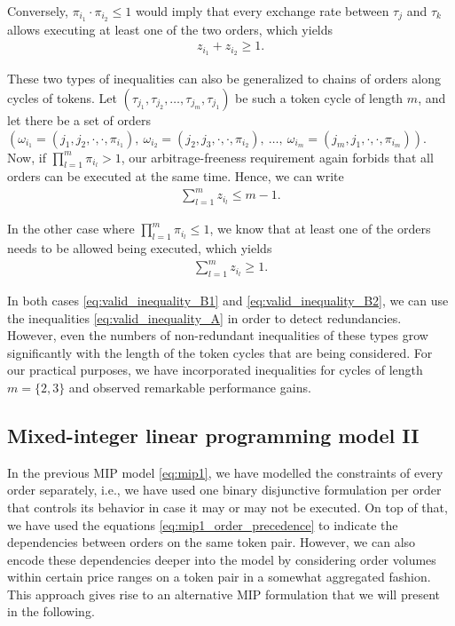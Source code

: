 \documentclass[11pt,parskip=full]{scrartcl}%
\newcommand*{\ie}{i.e., }
\begin{document}
Conversely, $ \pi_{i_1} \cdot \pi_{i_2} \le 1 $ would imply that every exchange rate between
$ \tau_j $ and $ \tau_k $ allows executing at least one of the two orders, which yields
\begin{align*}
  z_{i_1} + z_{i_2} \ge 1.
\end{align*}

These two types of inequalities can also be generalized to chains of orders along cycles of tokens.
Let $ (\tau_{j_1}, \tau_{j_2}, \ldots, \tau_{j_m}, \tau_{j_1}) $ be such a token cycle of
length $ m $, and let there be a set of orders
$ \left(
\omega_{i_1} = (j_1,j_2,\cdot,\cdot,\pi_{i_1}), \>
\omega_{i_2} = (j_2,j_3,\cdot,\cdot,\pi_{i_2}), \>
\ldots, \>
\omega_{i_m} = (j_m,j_1,\cdot,\cdot,\pi_{i_m})
\right) $.
Now, if $ \prod_{l=1}^m \pi_{i_l} > 1 $, our arbitrage-freeness requirement again forbids that all
orders can be executed at the same time. Hence, we can write
\begin{align}
  \sum\limits_{l=1}^m z_{i_l} \le m-1.
  \label{eq:valid_inequality_B1}
\end{align}

In the other case where $ \prod_{l=1}^m \pi_{i_l} \le 1 $, we know that at least one of the orders
needs to be allowed being executed, which yields
\begin{align}
  \sum\limits_{l=1}^m z_{i_l} \ge 1.
  \label{eq:valid_inequality_B2}
\end{align}

In both cases \eqref{eq:valid_inequality_B1} and \eqref{eq:valid_inequality_B2}, we can use the
inequalities \eqref{eq:valid_inequality_A} in order to detect redundancies.
However, even the numbers of non-redundant inequalities of these types grow significantly with the
length of the token cycles that are being considered.
For our practical purposes, we have incorporated inequalities for cycles of length $ m=\{2,3\} $
and observed remarkable performance gains.




\newpage
\subsection{Mixed-integer linear programming model II}
\label{subsec:MIP2}

In the previous MIP model \eqref{eq:mip1}, we have modelled the constraints of every order
separately, \ie we have used one binary disjunctive formulation per order that controls its
behavior in case it may or may not be executed.
On top of that, we have used the equations \eqref{eq:mip1_order_precedence} to indicate the
dependencies between orders on the same token pair.
However, we can also encode these dependencies deeper into the model by considering order volumes
within certain price ranges on a token pair in a somewhat aggregated fashion.
This approach gives rise to an alternative MIP formulation that we will present in the following.
\end{document}
